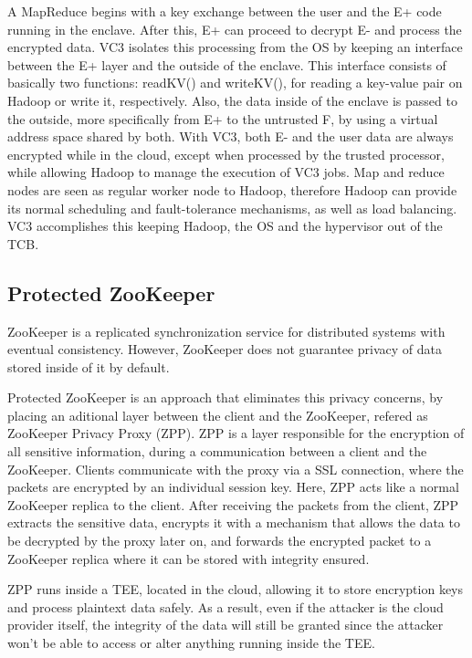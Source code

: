 A MapReduce begins with a key exchange between the user and the E+ code running in the enclave. After this, E+ can proceed to decrypt E- and process the encrypted data. VC3 isolates this processing from the OS by keeping an interface between the E+ layer and the outside of the enclave. This interface consists of basically two functions: readKV() and writeKV(), for reading a key-value pair on Hadoop or write it, respectively. Also, the data inside of the enclave is passed to the outside, more specifically from E+ to the untrusted F, by using a virtual address space shared by both.
With VC3, both E- and the user data are always encrypted while in the cloud, except when processed by the trusted processor, while allowing Hadoop to manage the execution of VC3 jobs. Map and reduce nodes are seen as regular worker node to Hadoop, therefore Hadoop can provide its normal scheduling and fault-tolerance mechanisms, as well as load balancing. VC3 accomplishes this keeping Hadoop, the OS and the hypervisor out of the TCB.




\subsection{Protected ZooKeeper}

ZooKeeper \cite{zookeeper} is a replicated synchronization service for distributed systems with eventual consistency. However, ZooKeeper does not guarantee privacy of data stored inside of it by default.
 
Protected ZooKeeper \cite{protectedZooKeeper} is an approach that eliminates this privacy concerns, by placing an aditional layer between the client and the ZooKeeper, refered as ZooKeeper Privacy Proxy (ZPP). ZPP is a layer responsible for the encryption of all sensitive information, during a communication between a client and the ZooKeeper. 
Clients communicate with the proxy via a SSL connection, where the packets are encrypted by an individual session key. Here, ZPP acts like a normal ZooKeeper replica to the client. 
After receiving the packets from the client, ZPP extracts the sensitive data, encrypts it with a mechanism that allows the data to be decrypted by the proxy later on, and forwards the encrypted packet to a ZooKeeper replica where it can be stored with integrity ensured.
 
ZPP runs inside a TEE, located in the cloud, allowing it to store encryption keys and process plaintext data safely. As a result, even if the attacker is the cloud provider itself, the integrity of the data will still be granted since the attacker won't be able to access or alter anything running inside the TEE.

